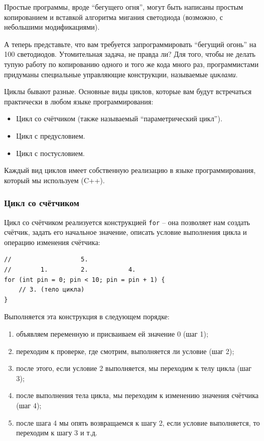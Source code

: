 \documentclass[a4paper,twoside]{book}
\begin{document}
Простые программы, вроде ``бегущего огня'', могут быть написаны простым
копированием и вставкой алгоритма мигания светодиода (возможно, с небольшими
модификациями).

А теперь представьте, что вам требуется запрограммировать ``бегущий огонь'' на
100 светодиодов. Утомительная задача, не правда ли? Для того, чтобы не делать
тупую работу по копированию одного и того же кода много раз, программистами
придуманы специальные управляющие конструкции, называемые \emph{циклами}.

Циклы бывают разные. Основные виды циклов, которые вам будут встречаться
практически в любом языке программирования:
\begin{itemize}
\item Цикл со счётчиком (также называемый ``параметрический цикл'').
\item Цикл с предусловием.
\item Цикл с постусловием.
\end{itemize}

Каждый вид циклов имеет собственную реализацию в языке программирования, который
мы используем (C++).

\subsubsection{Цикл со счётчиком}

Цикл со счётчиком реализуется конструкцией \texttt{for} -- она позволяет нам
создать счётчик, задать его начальное значение, описать условие выполнения цикла
и операцию изменения счётчика:

\begin{verbatim}
//                   5.
//        1.         2.           4.
for (int pin = 0; pin < 10; pin = pin + 1) {
    // 3. (тело цикла)
}
\end{verbatim}

Выполняется эта конструкция в следующем порядке:
\begin{enumerate}
\item объявляем переменную и присваиваем ей значение 0 (шаг 1);
\item переходим к проверке, где смотрим, выполняется ли условие (шаг 2);
\item после этого, если условие 2 выполняется, мы переходим к телу цикла (шаг 3);
\item после выполнения тела цикла, мы переходим к изменению значения счётчика (шаг 4);
\item после шага 4 мы опять возвращаемся к шагу 2, если условие выполняется, то
  переходим к шагу 3 и т.д.
\end{enumerate}
\end{document}
